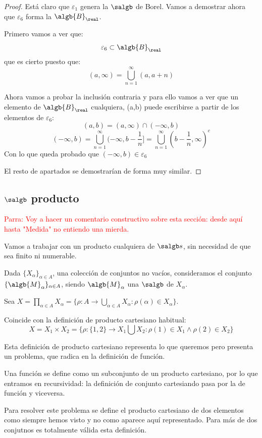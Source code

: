 \documentclass{apuntes}
\begin{document}
\begin{proof}
Está claro que $\varepsilon_1$ genera la $\salgb$ de Borel. Vamos a demostrar ahora que $\varepsilon_6$ forma la $\algb{B}_\real$.

Primero vamos a ver que:
\[\varepsilon_6 \subset \algb{B}_\real\]
que es cierto puesto que:
\[(a, \infty) = \bigcup_{n=1}^{\infty}(a,a+n)\]

Ahora vamos a probar la inclusión contraria y para ello vamos a ver que un elemento de $\algb{B}_\real$ cualquiera, (a,b) puede escribirse a partir de los elementos de $\varepsilon_6$:
\[(a,b) = (a, \infty) \cap (-\infty, b)\]
\[(-\infty, b) = \bigcup_{n=1}^{\infty}(- \infty, b - \frac{1}{n}]=\bigcup_{n=1}^{\infty}(b-\frac{1}{n}, \infty)^c\]
Con lo que queda probado que $(-\infty, b) \in \varepsilon_6$

El resto de apartados se demostrarían de forma muy similar.
\end{proof}

\subsection{$\salgb$ producto}
\textcolor{red}{Parra: Voy a hacer un comentario constructivo sobre esta sección: desde aquí hasta "Medida" no entiendo una mierda.}

Vamos a trabajar con un producto cualquiera de $\salgb s$, sin necesidad de que sea finito ni numerable.

Dada $\{X_\alpha\}_{\alpha\in A}$, una colección de conjuntos no vacíos, consideramos el conjunto $\{\algb{M}_\alpha\}_{\alpha\in A}$, siendo $\algb{M}_\alpha$ una $\salgb$ de $X_\alpha$.

Sea $X=\prod_{\alpha\in A}X_\alpha=\{\rho: A \rightarrow \bigcup_{\alpha\in A} X_\alpha : \rho(\alpha)\in X_\alpha\}$.


\obs Coincide con la definición de producto cartesiano habitual: \[X=X_1\times X_2=\{\rho: \{1,2\} \rightarrow X_1 \bigcup X_2 : \rho(1)\in X_1 \wedge \rho(2) \in X_2\}\]

Esta definición de producto cartesiano representa lo que queremos pero presenta un problema, que radica en la definición de función.

Una función se define como un subconjunto de un producto cartesiano, por lo que entramos en recursividad: la definición de conjunto cartesiando pasa por la de función y viceversa.

 Para resolver este problema se define el producto cartesiano de dos elementos como siempre hemos visto y no como aparece aquí representado. Para más de dos conjutnos es totalmente válida esta definición.
\end{document}
